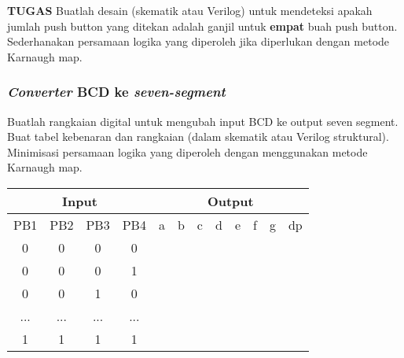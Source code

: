 \textbf{TUGAS} Buatlah desain (skematik atau Verilog) untuk mendeteksi apakah
jumlah push button yang ditekan adalah ganjil untuk \textbf{empat} buah
push button. Sederhanakan persamaan logika yang diperoleh jika diperlukan
dengan metode Karnaugh map.


\subsubsection{\textit{Converter} BCD ke \textit{seven-segment}}

Buatlah rangkaian digital untuk mengubah input BCD ke
output seven segment. Buat tabel kebenaran dan rangkaian (dalam skematik
atau Verilog struktural). Minimisasi persamaan logika yang diperoleh dengan menggunakan
metode Karnaugh map.

\begin{table}[H]
{\centering
\begin{tabular}{|c|c|c|c||c|c|c|c|c|c|c|c|}
\hline
\multicolumn{4}{|c||}{Input} & \multicolumn{8}{|c|}{Output} \\
\hline
PB1 & PB2 & PB3 & PB4 & a & b & c & d & e & f & g & dp \\
\hline
0 & 0 & 0 & 0 &  &  &  &  &  &  &  & \\
0 & 0 & 0 & 1 &  &  &  &  &  &  &  & \\
0 & 0 & 1 & 0 &  &  &  &  &  &  &  & \\
... & ... & ... & ... &  &  &  &  &  &  &  & \\
1 & 1 & 1 & 1 &  &  &  &  &  &  &  & \\
\hline
\end{tabular}
\par}
\end{table}

